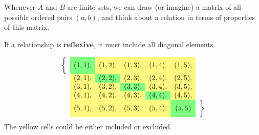 \documentclass[10pt]{beamer}
\begin{document}
\begin{frame}

\begin{myredbox}[title=Remark]
Whenever $A$ and $B$ are finite sets, we can draw (or imagine) a matrix of all possible ordered pairs $(a,b)$, and think about a relation in terms of properties of this matrix.
\end{myredbox}


\begin{mygreenbox}[title=Example]
If a relationship is \textbf{reflexive}, it must include all diagonal elements.

   \[
    \begin{array}{ccccccc}
        \bigg\{ &   \cellcolor{green!50} (1,1), & \cellcolor{yellow!50} (1,2), & \cellcolor{yellow!50} (1,3), & \cellcolor{yellow!50} (1,4), & \cellcolor{yellow!50} (1,5), &\\
         & \cellcolor{yellow!50} (2,1), & \cellcolor{green!50} (2,2), & \cellcolor{yellow!50} (2,3), & \cellcolor{yellow!50} (2,4), & \cellcolor{yellow!50} (2,5), &\\
        & \cellcolor{yellow!50} (3,1), & \cellcolor{yellow!50} (3,2), & \cellcolor{green!50} (3,3), & \cellcolor{yellow!50} (3,4), & \cellcolor{yellow!50} (3,5), &\\
        & \cellcolor{yellow!50} (4,1), & \cellcolor{yellow!50} (4,2), & \cellcolor{yellow!50} (4,3), & \cellcolor{green!50} (4,4), & \cellcolor{yellow!50} (4,5), & \\
        & \cellcolor{yellow!50} (5,1), & \cellcolor{yellow!50} (5,2), & \cellcolor{yellow!50} (5,3), & \cellcolor{yellow!50} (5,4), & \cellcolor{green!50} (5,5) & \bigg\} \\
    \end{array}
    \]
The yellow cells could be either included or excluded.
\end{mygreenbox}

\end{frame}
\end{document}
